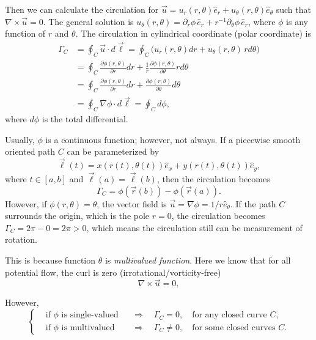 \documentclass[11pt,]{beamer}
\begin{document}
\begin{frame}
	Then we can calculate the circulation for 
	$\vec{u} = u_r(r,\theta)\hat{e}_r + u_\theta(r,\theta)\hat{e}_\theta$ 
	such that $\nabla \times \vec{u}= 0$.
	The general solution is $u_\theta(r,\theta) = \partial_{r}\phi\,\hat{e}_{r} + r^{-1}\partial_\theta \phi\,\hat{e}_{r} $, where $\phi$ is any function of $r$ and $\theta$. The circulation in cylindrical coordinate (polar coordinate) is 
	\begin{align}
	\Gamma_{C} 
	&= \oint_{C}\vec{u}\cdot d\vec{\ell} = \oint_{C} \bigg(u_{r}(r,\theta)dr + u_{\theta}(r,\theta)\,rd\theta\bigg)\\
	&= \oint_{C} \frac{\partial \phi(r,\theta)}{\partial r} dr + \frac{1}{r}\frac{\partial \phi(r,\theta)}{\partial \theta} rd\theta\\
	&= \oint_{C} \frac{\partial \phi(r,\theta)}{\partial r} dr + \frac{\partial \phi(r,\theta)}{\partial \theta} d\theta\\
	&= \oint_{C} \nabla\phi\cdot d\vec{\ell} =\oint_{C}d\phi,
	\end{align}
	where $d\phi$ is the total differential.
\end{frame}
\begin{frame}
	Usually, $\phi$ is a continuous function; however, not always. 
	If a piecewise smooth oriented path $C$ can be parameterized by
	\begin{equation}
	\vec{\ell}(t) = x(r(t),\theta(t))\hat{e}_{x} + y(r(t),\theta(t))\hat{e}_{y},
	\end{equation}
	where $t\in[a,b]$ and $\vec{\ell}(a) = \vec{\ell}(b)$, then the circulation becomes
	\begin{equation}
	\Gamma_{C} = \phi(\vec{r}(b)) - \phi(\vec{r}(a)).
	\end{equation}
	However, if $\phi(r,\theta) = \theta$, 
	the vector field is $\vec{u}=\nabla\phi = 1/r \hat{e}_{\theta}$. 
	If the path $C$ surrounds the origin, which is the pole $r=0$, 
	the circulation becomes $\Gamma_C = 2\pi - 0 = 2\pi > 0$, 
	which means the circulation still can be measurement of rotation.

\end{frame}
\begin{frame}
This is because function $\theta$ is \textit{multivalued function}. Here we know that for all potential flow, the curl is zero (irrotational/vorticity-free)
\begin{equation*}
\nabla \times \vec{u} = 0,
\end{equation*}

However, 
\begin{equation*}
\left\{\begin{aligned}
&\text{if $\phi$ is single-valued}
&&\Rightarrow\quad
\Gamma_{C} = 0,\quad \text{for any closed curve $C$,}
\\
&\text{if $\phi$ is multivalued}
&&\Rightarrow\quad
\Gamma_{C} \neq 0,\quad \text{for some closed curves $C$.}
\end{aligned}\right.
\end{equation*}

\end{frame}
\end{document}

